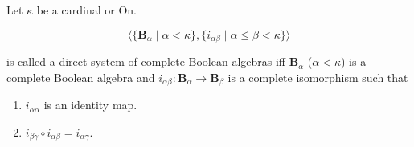 Let $\kappa$ be a cardinal or $\mathrm{On}$.

$$\langle \{\mathbf{B}_{\alpha} \mid \alpha < \kappa\}, \{i_{\alpha\beta} \mid \alpha \leq \beta < \kappa\} \rangle$$

is called a direct system of complete Boolean algebras iff $\mathbf{B}_{\alpha}$ ($\alpha < \kappa$) is a complete Boolean algebra and $i_{\alpha\beta}: \mathbf{B}_{\alpha} \to \mathbf{B}_{\beta}$ is a complete isomorphism such that

\begin{enumerate}
\item $i_{\alpha\alpha}$ is an identity map.
\item $i_{\beta\gamma} \circ i_{\alpha\beta} = i_{\alpha\gamma}$.
\end{enumerate}
